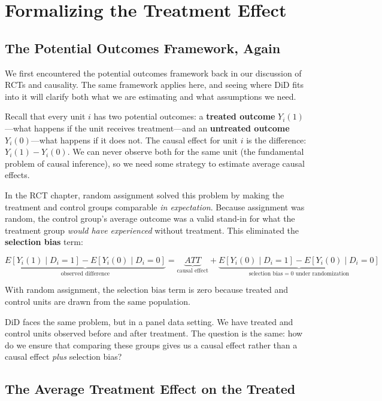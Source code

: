 \documentclass[
  letterpaper,
  DIV=11,
  numbers=noendperiod]{scrreprt}
\begin{document}
\section{Formalizing the Treatment
Effect}\label{formalizing-the-treatment-effect}

\subsection{The Potential Outcomes Framework,
Again}\label{the-potential-outcomes-framework-again}

We first encountered the potential outcomes framework back in our
discussion of RCTs and causality. The same framework applies here, and
seeing where DiD fits into it will clarify both what we are estimating
and what assumptions we need.

Recall that every unit \(i\) has two potential outcomes: a
\textbf{treated outcome} \(Y_i(1)\)---what happens if the unit receives
treatment---and an \textbf{untreated outcome} \(Y_i(0)\)---what happens
if it does not. The causal effect for unit \(i\) is the difference:
\(Y_i(1) - Y_i(0)\). We can never observe both for the same unit (the
fundamental problem of causal inference), so we need some strategy to
estimate average causal effects.

In the RCT chapter, random assignment solved this problem by making the
treatment and control groups comparable \emph{in expectation}. Because
assignment was random, the control group's average outcome was a valid
stand-in for what the treatment group \emph{would have experienced}
without treatment. This eliminated the \textbf{selection bias} term:

\[
\underbrace{E[Y_i(1) \mid D_i = 1] - E[Y_i(0) \mid D_i = 0]}_{\text{observed difference}} = \underbrace{ATT}_{\text{causal effect}} + \underbrace{E[Y_i(0) \mid D_i = 1] - E[Y_i(0) \mid D_i = 0]}_{\text{selection bias} = 0 \text{ under randomization}}
\]

With random assignment, the selection bias term is zero because treated
and control units are drawn from the same population.

DiD faces the same problem, but in a panel data setting. We have treated
and control units observed before and after treatment. The question is
the same: how do we ensure that comparing these groups gives us a causal
effect rather than a causal effect \emph{plus} selection bias?

\subsection{The Average Treatment Effect on the
Treated}\label{the-average-treatment-effect-on-the-treated}
\end{document}
